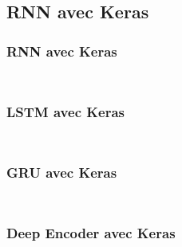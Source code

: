 \subsection{RNN avec Keras}



\begin{frame}
  \frametitle{RNN avec Keras}
  \inputminted[linenos,fontsize=\small,bgcolor=pythonbg]{python}{code-illustration/tf-keras-rnn.py}
  \inputminted[linenos,fontsize=\small,bgcolor=returnbg]{python}{code-illustration/tf-keras-rnn.txt}
\end{frame}

\begin{frame}
  \frametitle{LSTM avec Keras}
  \inputminted[linenos,fontsize=\small,bgcolor=pythonbg]{python}{code-illustration/tf-keras-lstm.py}
  \inputminted[linenos,fontsize=\small,bgcolor=returnbg]{python}{code-illustration/tf-keras-lstm.txt}
\end{frame}

\begin{frame}
  \frametitle{GRU avec Keras}
  \inputminted[linenos,fontsize=\small,bgcolor=pythonbg]{python}{code-illustration/tf-keras-gru.py}
  \inputminted[linenos,fontsize=\small,bgcolor=returnbg]{python}{code-illustration/tf-keras-gru.txt}
\end{frame}

\begin{frame}
  \frametitle{Deep Encoder avec Keras}
  \inputminted[linenos,fontsize=\small,bgcolor=pythonbg]{python}{code-illustration/tf-keras-rnn-all-timestep.py}
  \inputminted[linenos,fontsize=\small,bgcolor=returnbg]{python}{code-illustration/tf-keras-rnn-all-timestep.txt}
\end{frame}

